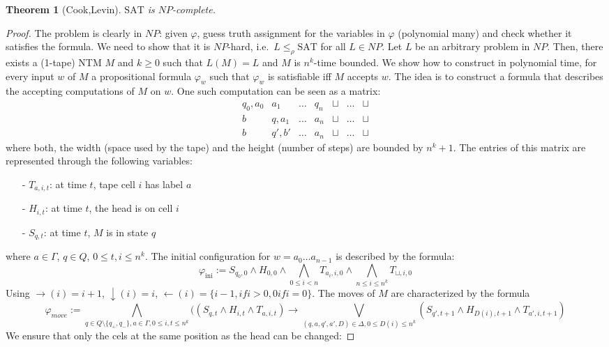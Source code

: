 \documentclass{report}
\newtheorem{theorem}[definition]{Theorem}
\begin{document}
\begin{theorem}[Cook,Levin] $\mathrm{SAT}$ is $NP$-complete.
\end{theorem}
\begin{proof} The problem is clearly in $NP$: given $\varphi$, guess truth assignment for the variables in $\varphi$ (polynomial many) and check whether it satisfies the formula. We need to show that it is $NP$-hard, i.e.\ $L\leq_\rho \mathrm{SAT}$ for all $L \in NP$. Let $L$ be an arbitrary problem in $NP$. Then, there exists a (1-tape) NTM $M$ and $k\geq 0$ such that $L(M)=L$ and $M$ is $n^k$-time bounded. We show how to construct in polynomial time, for every input $w$ of $M$ a propositional formula $\varphi_w$ such that $\varphi_w$ is satisfiable iff $M$ accepts $w$. The idea is to construct a formula that describes the accepting computations of $M$ on $w$. One such computation can be seen as a matrix:
\[
\begin{array}{c|c|c|c|c|c|c}
q_0,a_0 & a_1 & \dots & q_n & \sqcup & \dots & \sqcup\\
b & q,a_1 & \dots & a_n & \sqcup & \dots & \sqcup\\
b & q',b' & \dots & a_n & \sqcup & \dots & \sqcup
\end{array}
\]
where both, the width (space used by the tape) and the height (number of steps) are bounded by $n^k+1$. The entries of this matrix are represented through the following variables:
\begin{itemize}
\item[-] $T_{a,i,t}$: at time $t$, tape cell $i$ has label $a$
\item[-] $H_{i,t}$: at time $t$, the head is on cell $i$
\item[-] $S_{q,t}$: at time $t$, $M$ is in state $q$
\end{itemize}
where $a\in\Gamma$, $q \in Q$, $0 \leq t,i \leq n^k$. The initial configuration for $w = a_0 \dots a_{n-1}$ is described by the formula:
\[ \varphi_{\text{ini}} := S_{q_0,0} \land H_{0,0} \land \bigwedge_{0\leq i<n} T_{a_i,i,0} \land \bigwedge_{n\leq i \leq n^k} T_{\sqcup,i,0} \]
Using $\rightarrow(i)=i+1$, $\downarrow(i)=i$, $\leftarrow(i)=\{i-1, if i>0, 0 if i=0\}$. The moves of $M$ are characterized by the formula 
\[
\varphi_{move} := \bigwedge_{q\in Q \setminus \{q_+,q_-\}, a \in \Gamma, 0\leq i,t\leq n^k}((S_{q,t} \land H_{i,t} \land T_{a,i,t}) \rightarrow \bigvee_{(q,a,q',a',D) \in \Delta, 0\leq D(i) \leq n^k}(S_{q',t+1} \land H_{D(i),t+1} \land T_{a',i,t+1})
\]
We ensure that only the cels at the same position as the head can be changed:

\end{proof}
\end{document}
